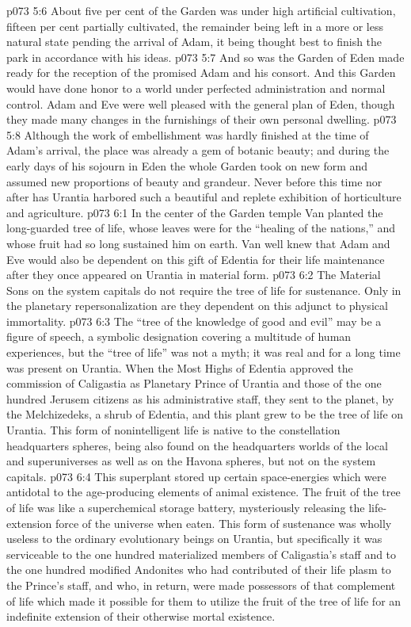 \vs p073 5:6 About five per cent of the Garden was under high artificial cultivation, fifteen per cent partially cultivated, the remainder being left in a more or less natural state pending the arrival of Adam, it being thought best to finish the park in accordance with his ideas.
\vs p073 5:7 And so was the Garden of Eden made ready for the reception of the promised Adam and his consort. And this Garden would have done honor to a world under perfected administration and normal control. Adam and Eve were well pleased with the general plan of Eden, though they made many changes in the furnishings of their own personal dwelling.
\vs p073 5:8 Although the work of embellishment was hardly finished at the time of Adam’s arrival, the place was already a gem of botanic beauty; and during the early days of his sojourn in Eden the whole Garden took on new form and assumed new proportions of beauty and grandeur. Never before this time nor after has Urantia harbored such a beautiful and replete exhibition of horticulture and agriculture.
\vs p073 6:1 In the center of the Garden temple Van planted the long\hyp{}guarded tree of life, whose leaves were for the “healing of the nations,” and whose fruit had so long sustained him on earth. Van well knew that Adam and Eve would also be dependent on this gift of Edentia for their life maintenance after they once appeared on Urantia in material form.
\vs p073 6:2 The Material Sons on the system capitals do not require the tree of life for sustenance. Only in the planetary repersonalization are they dependent on this adjunct to physical immortality.
\vs p073 6:3 \pc The “tree of the knowledge of good and evil” may be a figure of speech, a symbolic designation covering a multitude of human experiences, but the “tree of life” was not a myth; it was real and for a long time was present on Urantia. When the Most Highs of Edentia approved the commission of Caligastia as Planetary Prince of Urantia and those of the one hundred Jerusem citizens as his administrative staff, they sent to the planet, by the Melchizedeks, a shrub of Edentia, and this plant grew to be the tree of life on Urantia. This form of nonintelligent life is native to the constellation headquarters spheres, being also found on the headquarters worlds of the local and superuniverses as well as on the Havona spheres, but not on the system capitals.
\vs p073 6:4 This superplant stored up certain space\hyp{}energies which were antidotal to the age\hyp{}producing elements of animal existence. The fruit of the tree of life was like a superchemical storage battery, mysteriously releasing the life\hyp{}extension force of the universe when eaten. This form of sustenance was wholly useless to the ordinary evolutionary beings on Urantia, but specifically it was serviceable to the one hundred materialized members of Caligastia’s staff and to the one hundred modified Andonites who had contributed of their life plasm to the Prince’s staff, and who, in return, were made possessors of that complement of life which made it possible for them to utilize the fruit of the tree of life for an indefinite extension of their otherwise mortal existence.
